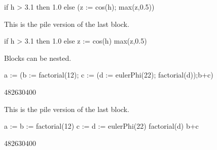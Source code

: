 {\begin{xtc}
\begin{spadsrc}
if h > 3.1 then 1.0 else (z := cos(h); max(z,0.5)) 
\end{spadsrc}
\begin{TeXOutput}
\begin{fricasmath}{7}
%
\end{fricasmath}
\end{TeXOutput}
\end{xtc}
\begin{xtc}
\begin{xtccomment}
This is the pile version of the last block.
\end{xtccomment}
\begin{spadsrc}
if h > 3.1 then
    1.0
  else
    z := cos(h)
    max(z,0.5)
\end{spadsrc}
\begin{TeXOutput}
\begin{fricasmath}{8}
%
\end{fricasmath}
\end{TeXOutput}
\end{xtc}
\begin{xtc}
\begin{xtccomment}
Blocks can be nested.
\end{xtccomment}
\begin{spadsrc}
a := (b := factorial(12); c := (d := eulerPhi(22); factorial(d));b+c)
\end{spadsrc}
\begin{TeXOutput}
\begin{fricasmath}{9}
482630400%
\end{fricasmath}
\end{TeXOutput}
\end{xtc}
\begin{xtc}
\begin{xtccomment}
This is the pile version of the last block.
\end{xtccomment}
\begin{spadsrc}
a :=
  b := factorial(12)
  c :=
    d := eulerPhi(22)
    factorial(d)
  b+c
\end{spadsrc}
\begin{TeXOutput}
\begin{fricasmath}{10}
482630400%
\end{fricasmath}
\end{TeXOutput}
\end{xtc}

}
